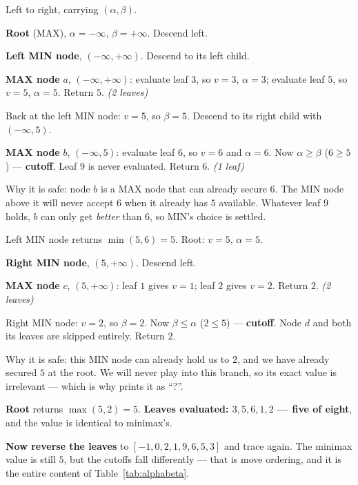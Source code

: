 \begin{worked}
Left to right, carrying $(\alpha, \beta)$.

\smallskip
\textbf{Root} (MAX), $\alpha = -\infty$, $\beta = +\infty$. Descend left.

\smallskip
\textbf{Left MIN node}, $(-\infty, +\infty)$. Descend to its left child.

\smallskip
\textbf{MAX node }$a$, $(-\infty, +\infty)$: evaluate leaf $3$, so $v=3$,
$\alpha = 3$; evaluate leaf $5$, so $v=5$, $\alpha=5$. Return $5$.
\emph{(2 leaves)}

\smallskip
Back at the left MIN node: $v = 5$, so $\beta = 5$. Descend to its right child
with $(-\infty, 5)$.

\smallskip
\textbf{MAX node }$b$, $(-\infty, 5)$: evaluate leaf $6$, so $v = 6$ and
$\alpha = 6$. Now $\alpha \ge \beta$ ($6 \ge 5$) --- \textbf{cutoff}. Leaf $9$ is
never evaluated. Return $6$. \emph{(1 leaf)}

\smallskip
Why it is safe: node $b$ is a MAX node that can already secure $6$. The MIN node
above it will never accept $6$ when it already has $5$ available. Whatever leaf $9$
holds, $b$ can only get \emph{better} than $6$, so MIN's choice is settled.

\smallskip
Left MIN node returns $\min(5, 6) = 5$. Root: $v = 5$, $\alpha = 5$.

\smallskip
\textbf{Right MIN node}, $(5, +\infty)$. Descend left.

\smallskip
\textbf{MAX node }$c$, $(5, +\infty)$: leaf $1$ gives $v=1$; leaf $2$ gives $v=2$.
Return $2$. \emph{(2 leaves)}

\smallskip
Right MIN node: $v = 2$, so $\beta = 2$. Now $\beta \le \alpha$ ($2 \le 5$) ---
\textbf{cutoff}. Node $d$ and both its leaves are skipped entirely. Return $2$.

\smallskip
Why it is safe: this MIN node can already hold us to $2$, and we have already
secured $5$ at the root. We will never play into this branch, so its exact value is
irrelevant --- which is why  prints it as ``?''.

\smallskip
\textbf{Root} returns $\max(5,2) = 5$. \textbf{Leaves evaluated: $3, 5, 6, 1, 2$
--- five of eight}, and the value is identical to minimax's.

\smallskip
\textbf{Now reverse the leaves} to $[-1, 0, 2, 1, 9, 6, 5, 3]$ and trace again. The
minimax value is still $5$, but the cutoffs fall differently --- that is move
ordering, and it is the entire content of Table~\ref{tab:alphabeta}.
\end{worked}

